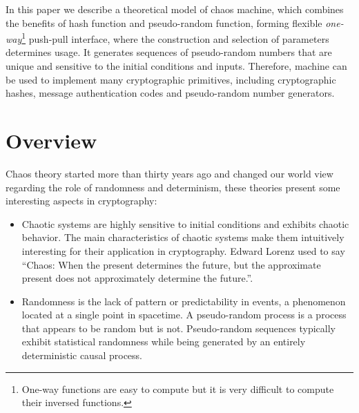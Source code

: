 \documentclass[twocolumn, a4paper, 10pt]{article}
\begin{document}
In this paper we describe a theoretical model of chaos machine, which combines the benefits of hash function and pseudo-random function, forming flexible \textit{one-way}\footnote{One-way functions are easy to compute but it is very difficult to compute their inversed functions.} push-pull interface, where the construction and selection of parameters determines usage. It generates sequences of pseudo-random numbers that are unique and sensitive to the initial conditions and inputs. Therefore, machine can be used to implement many cryptographic primitives, including cryptographic hashes, message authentication codes and pseudo-random number generators.




\section{Overview}

Chaos theory started more than thirty years ago and changed our world view regarding the role of randomness and determinism, these theories present some interesting aspects in cryptography: \begin{itemize} \item Chaotic systems are highly sensitive to initial conditions and exhibits chaotic behavior. The main characteristics of chaotic systems make them intuitively interesting for their application in cryptography. Edward Lorenz used to say ``Chaos: When the present determines the future, but the approximate present does not approximately determine the future.''.
\item Randomness is the lack of pattern or predictability in events, a phenomenon located at a single point in spacetime. A pseudo-random process is a process that appears to be random but is not. Pseudo-random sequences typically exhibit statistical randomness while being generated by an entirely deterministic causal process. \end{itemize}
\end{document}
